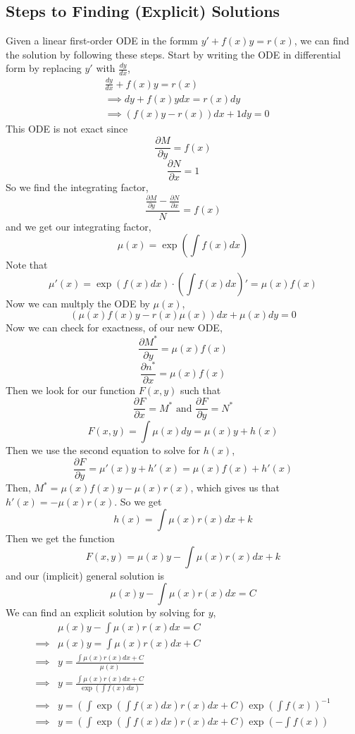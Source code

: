 \documentclass[openany]{report}
\begin{document}
\subsection{Steps to Finding (Explicit) Solutions}
Given a linear first-order ODE in the formm $y' + f(x)y = r(x)$, we can find the solution by following these steps. Start by writing the ODE in differential form by replacing $y'$ with $\frac{dy}{dx}$,
    \begin{align*}
        &\frac{dy}{dx} + f(x)y = r(x)\\
        &\implies dy + f(x)ydx = r(x)dy\\
        &\implies (f(x)y - r(x))dx + 1dy = 0  
    \end{align*}
    This ODE is not exact since 
    \[\frac{\partial M}{\partial y} = f(x)\]
    \[\frac{\partial N}{\partial x} = 1\]
    So we find the integrating factor,
    \[\frac{\frac{\partial M}{\partial y} - \frac{\partial N}{\partial x}}{N} = f(x)\]
    and we get our integrating factor, 
    \[\mu(x) = \exp\left(\int f(x)dx\right)\]
    Note that 
    \[\mu'(x) = \exp\left(f(x)dx\right)\cdot \left(\int f(x)dx\right)' = \mu(x) f(x)\]
    Now we can multply the ODE by $\mu(x)$,
    \[(\mu(x)f(x)y - r(x)\mu(x))dx + \mu(x)dy = 0\]
    Now we can check for exactness, of our new ODE, 
    \[\frac{\partial M^*}{\partial y} =\mu(x)f(x)\]
    \[\frac{\partial n^*}{\partial x} =\mu(x)f(x)\]
    Then we look for our function $F(x,y)$ such that
    \[\frac{\partial F}{\partial x} = M^* \text{ and } \frac{\partial F}{\partial y} = N^*\]
    \[F(x,y) = \int \mu(x) dy = \mu(x)y + h(x)\]
    Then we use the second equation to solve for $h(x)$,
    \[\frac{\partial F}{\partial y} = \mu'(x)y + h'(x) = \mu(x)f(x) + h'(x)\]
    Then, $M^* = \mu(x)f(x)y - \mu(x)r(x)$, which gives us that $h'(x) = - \mu(x)r(x)$. So we get
    \[h(x) = \int \mu(x)r(x)dx  + k \]
    Then we get the function 
    \[F(x,y) = \mu(x)y - \int \mu(x)r(x)dx + k\]
    and our (implicit) general solution is 
    \[\mu(x)y - \int\mu(x)r(x)dx = C\]
    We can find an explicit solution by solving for $y$, 
    \begin{align*}
        &\mu(x)y - \int\mu(x)r(x)dx = C\\
        \implies &\mu(x)y = \int\mu(x)r(x)dx + C\\
        \implies &y = \frac{\int\mu(x)r(x)dx + C}{\mu(x)}\\
        \implies &y = \frac{\int\mu(x)r(x)dx + C}{\exp\left(\int f(x)dx\right)}\\
        \implies &y = \left(\int \exp\left(\int f(x)dx\right)r(x)dx + C\right)\exp\left(\int f(x)\right)^{-1}\\
        \implies &y = \left(\int \exp\left(\int f(x)dx\right)r(x)dx + C\right)\exp\left(-\int f(x)\right)
    \end{align*}
\end{document}
